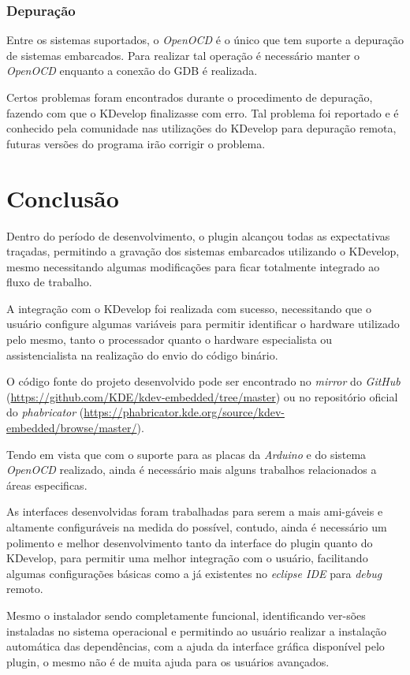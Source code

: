 \subsection{Depuração}
Entre os sistemas suportados, o \textit{OpenOCD} é o único que tem suporte a depuração de sistemas embarcados. Para realizar tal operação é necessário manter o \textit{OpenOCD} enquanto a conexão do GDB é realizada.

Certos problemas foram encontrados durante o procedimento de depuração, fazendo com que o KDevelop finalizasse com erro. Tal problema foi reportado e é conhecido pela comunidade nas utilizações do KDevelop para depuração remota, futuras versões do programa irão corrigir o problema.

\chapter{Conclusão}
Dentro do período de desenvolvimento, o plugin alcançou todas as expectativas traçadas,
permitindo a gravação dos sistemas embarcados utilizando o KDevelop, mesmo necessitando algumas modificações para ficar
totalmente integrado ao fluxo de trabalho.

A integração com o KDevelop foi realizada com sucesso, necessitando que o usuário configure algumas variáveis para permitir identificar o hardware utilizado pelo mesmo, tanto o processador quanto o hardware especialista ou assistencialista na realização do envio do código binário.

O código fonte do projeto desenvolvido pode ser encontrado no \textit{mirror} do \textit{GitHub} (\url{https://github.com/KDE/kdev-embedded/tree/master}) ou no repositório oficial do \textit{phabricator} (\url{https://phabricator.kde.org/source/kdev-embedded/browse/master/}).

Tendo em vista que com o suporte para as placas da \textit{Arduino} e do sistema \textit{OpenOCD} realizado, ainda é necessário mais alguns trabalhos relacionados a áreas especificas.

As interfaces desenvolvidas foram trabalhadas para serem a mais ami-gáveis e altamente configuráveis na medida do possível, contudo, ainda é necessário um polimento e melhor desenvolvimento tanto da interface do plugin quanto do KDevelop, para permitir uma melhor integração com o usuário, facilitando algumas configurações básicas como a já existentes no \textit{eclipse IDE} para \textit{debug} remoto.

Mesmo o instalador sendo completamente funcional, identificando ver-sões instaladas no sistema operacional e
permitindo ao usuário realizar a instalação automática das dependências, com a ajuda da interface gráfica disponível pelo plugin, o mesmo não é de muita ajuda para os usuários avançados.

